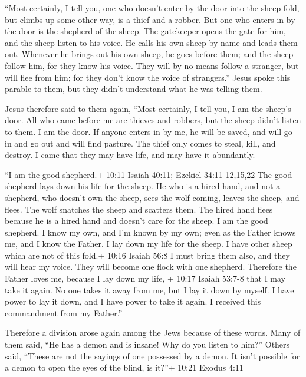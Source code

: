  ``Most certainly, I tell you, one who doesn't enter by the
door into the sheep fold, but climbs up some other way, is a thief and a
robber.  But one who enters in by the door is the shepherd
of the sheep.  The gatekeeper opens the gate for him, and
the sheep listen to his voice. He calls his own sheep by name and leads
them out.  Whenever he brings out his own sheep, he goes
before them; and the sheep follow him, for they know his voice.
 They will by no means follow a stranger, but will flee from
him; for they don't know the voice of strangers.''  Jesus
spoke this parable to them, but they didn't understand what he was
telling them.

 Jesus therefore said to them again, ``Most certainly, I
tell you, I am the sheep's door.  All who came before me are
thieves and robbers, but the sheep didn't listen to them.  I
am the door. If anyone enters in by me, he will be saved, and will go in
and go out and will find pasture.  The thief only comes to
steal, kill, and destroy. I came that they may have life, and may have
it abundantly.

 ``I am the good shepherd.+ 10:11 Isaiah 40:11; Ezekiel
34:11-12,15,22 The good shepherd lays down his life for the sheep.
 He who is a hired hand, and not a shepherd, who doesn't
own the sheep, sees the wolf coming, leaves the sheep, and flees. The
wolf snatches the sheep and scatters them.  The hired hand
flees because he is a hired hand and doesn't care for the sheep.
 I am the good shepherd. I know my own, and I'm known by my
own;  even as the Father knows me, and I know the Father. I
lay down my life for the sheep.  I have other sheep which
are not of this fold.+ 10:16 Isaiah 56:8 I must bring them also, and
they will hear my voice. They will become one flock with one shepherd.
 Therefore the Father loves me, because I lay down my life,
+ 10:17 Isaiah 53:7-8 that I may take it again.  No one
takes it away from me, but I lay it down by myself. I have power to lay
it down, and I have power to take it again. I received this commandment
from my Father.''

 Therefore a division arose again among the Jews because of
these words.  Many of them said, ``He has a demon and is
insane! Why do you listen to him?''  Others said, ``These
are not the sayings of one possessed by a demon. It isn't possible for a
demon to open the eyes of the blind, is it?''+ 10:21 Exodus 4:11

